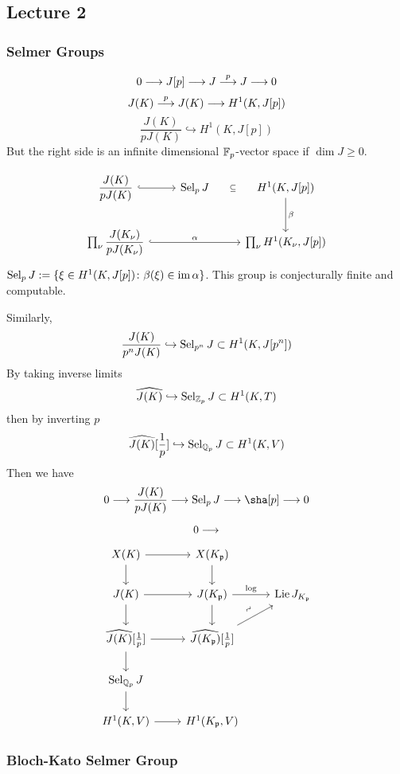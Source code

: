 \newpage
\subsection{Lecture 2}
\subsubsection{Selmer Groups}

	\[
	0 \stackrel{}{\longrightarrow} J[p] \stackrel{}{\longrightarrow} J \stackrel{p}{\longrightarrow} J \stackrel{}{\longrightarrow} 0
	\]
	\[
	J(K) \stackrel{p}{\longrightarrow} J(K) \stackrel{}{\longrightarrow} H^1(K, J[p])
	\]
	\[
	\dfrac{J(K)}{pJ(K)} \hookrightarrow H^1(K,J[p])
	\]
But the right side is an infinite dimensional $\mathbb{F}_p$-vector space if $\dim J \geq 0$. 

	\[
	\begin{tikzcd}
	\dfrac{J(K)}{pJ(K)} \arrow[hook]{r} & \sel_p J \arrow[draw=none]{r}[sloped,auto=false]{\subseteq} & H^1(K,J[p]) \arrow{d}{\beta} \\
	\prod_\nu \dfrac{J(K_\nu)}{pJ(K_\nu)} \arrow[hook]{rr}{\alpha} & & \prod_\nu H^1(K_\nu,J[p])
	\end{tikzcd}
	\]
$\operatorname{Sel}_p J:= \{ \xi \in H^1(K,J[p]) \colon \beta(\xi) \in \operatorname{im} \alpha \}$. This group is conjecturally finite and computable. 


Similarly,
	\[
	\dfrac{J(K)}{p^nJ(K)} \hookrightarrow \operatorname{Sel}_{p^n} J \subset H^1(K,J[p^n])
	\]
By taking inverse limits
	\[
	\widehat{J(K)} \hookrightarrow \operatorname{Sel}_{\mathbb{Z}_p} J \subset H^1(K,T)
	\]
then by inverting $p$
	\[
	\widehat{J(K)}[\frac{1}{p}] \hookrightarrow \operatorname{Sel}_{\mathbb{Q}_p} J \subset H^1(K,V)
	\]
Then we have
	\[
	0 \ma{} \dfrac{J(K)}{pJ(K)} \ma{} \sel_p J \ma{} \sha[p] \ma{} 0
	\]
	
	\[
	0 \stackrel{}{\longrightarrow} 
	\] %


	\[
	\begin{tikzcd}
	X(K) \arrow{d} \arrow{r} & X(K_\p) \arrow{d} \\
	J(K) \arrow{r} \arrow{d} & J(K_\p) \arrow{r}{\log} \arrow{d} & \lie J_{K_\p} \\
	\widehat{J(K)}[\frac{1}{p}] \arrow{r} \arrow{d} & \widehat{J(K_\p)}[\frac{1}{p}] \arrow{ur}{\rotatebox{45}{$\sim$}} \\
	\sel_{\Q_p} J \arrow{d} \\
	H^1(K,V) \arrow{r} & H^1(K_\p,V)
	\end{tikzcd}
	\]



\subsubsection{Bloch-Kato Selmer Group}

